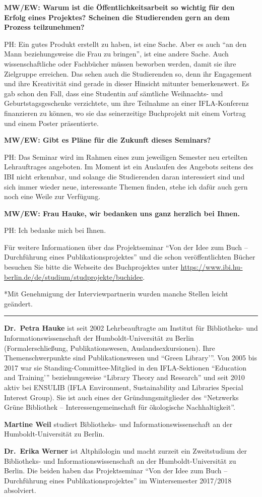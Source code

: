 \documentclass[a4paper,
fontsize=11pt,
oneside,
numbers=noperiodatend,
parskip=half-,
bibliography=totoc,
final
]{scrartcl}
\begin{document}
\textbf{MW/EW: Warum ist die Öffentlichkeitsarbeit so wichtig für den
Erfolg eines Projektes? Scheinen die Studierenden gern an dem Prozess
teilzunehmen?}

PH: Ein gutes Produkt erstellt zu haben, ist eine Sache. Aber es auch
\enquote{an den Mann beziehungsweise die Frau zu bringen}, ist eine
andere Sache. Auch wissenschaftliche oder Fachbücher müssen beworben
werden, damit sie ihre Zielgruppe erreichen. Das sehen auch die
Studierenden so, denn ihr Engagement und ihre Kreativität sind gerade in
dieser Hinsicht mitunter bemerkenswert. Es gab schon den Fall, dass eine
Studentin auf sämtliche Weihnachts- und Geburtstagsgeschenke
verzichtete, um ihre Teilnahme an einer IFLA-Konferenz finanzieren zu
können, wo sie das seinerzeitige Buchprojekt mit einem Vortrag und einem
Poster präsentierte.

\textbf{MW/EW: Gibt es Pläne für die Zukunft dieses Seminars?}

PH: Das Seminar wird im Rahmen eines zum jeweiligen Semester neu
erteilten Lehrauftrages angeboten. Im Moment ist ein Auslaufen des
Angebots seitens des IBI nicht erkennbar, und solange die Studierenden
daran interessiert sind und sich immer wieder neue, interessante Themen
finden, stehe ich dafür auch gern noch eine Weile zur Verfügung.

\textbf{MW/EW: Frau Hauke, wir bedanken uns ganz herzlich bei Ihnen.}

PH: Ich bedanke mich bei Ihnen.

Für weitere Informationen über das Projektseminar \enquote{Von der Idee
zum Buch -- Durchführung eines Publikationsprojektes} und die schon
veröffentlichten Bücher besuchen Sie bitte die Webseite des
Buchprojektes unter
\url{https://www.ibi.hu-berlin.de/de/studium/studprojekte/buchidee}.

*Mit Genehmigung der Interviewpartnerin wurden manche Stellen leicht
geändert.

\begin{center}\rule{0.5\linewidth}{\linethickness}\end{center}

\textbf{Dr.~Petra Hauke} ist seit 2002 Lehrbeauftragte am Institut für
Bibliotheks- und Informationswissenschaft der Humboldt-Universität zu
Berlin (Formalerschließung, Publikationswesen, Auslandsexkursionen).
Ihre Themenschwerpunkte sind Publikationswesen und \enquote{Green Library'}.
Von 2005 bis 2017 war sie Standing-Committee-Mitglied in den
IFLA-Sektionen \enquote{Education and Training'} beziehungsweise \enquote{Library
Theory and Research} und seit 2010 aktiv bei ENSULIB (IFLA Environment,
Sustainability and Libraries Special Interest Group). Sie ist auch eines
der Gründungsmitglieder des \enquote{Netzwerks Grüne Bibliothek --
Interessengemeinschaft für ökologische Nachhaltigkeit}.

\textbf{Martine Weil} studiert Bibliotheks- und Informationswissenschaft
an der Humboldt-Universität zu Berlin.

\textbf{Dr.~Erika Werner} ist Altphilologin und macht zurzeit ein
Zweitstudium der Bibliotheks- und Informationswissenschaft an der
Humboldt-Universität zu Berlin. Die beiden haben das Projektseminar
\enquote{Von der Idee zum Buch -- Durchführung eines Publikationsprojektes} im
Wintersemester 2017/2018 absolviert.
\end{document}
